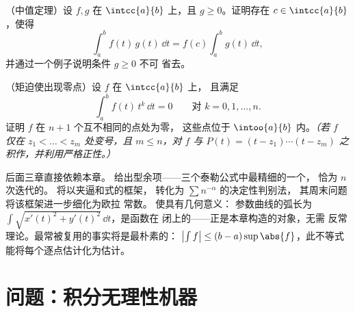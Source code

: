 \begin{exercise}[$\star\star$]\label{exo:b1:integration:11}
（中值定理）设 $f, g$ 在
$\intcc{a}{b}$ 上，且 $g \geq 0$。证明存在 $c \in
\intcc{a}{b}$，使得
\[
\int_a^b f(t)\,g(t)\,\dd t = f(c)\int_a^b g(t)\,\dd t ,
\]
并通过一个例子说明条件 $g \geq 0$ 不可
省去。
\end{exercise}

\begin{exercise}[$\star\star\star$]\label{exo:b1:integration:12}
（矩迫使出现零点）设 $f$ 在 $\intcc{a}{b}$ 上，
且满足
\[
\int_a^b f(t)\,t^k\,\dd t = 0 \qquad \text{对 } k = 0, 1,
\dots, n .
\]
证明 $f$ 在 $n + 1$ 个互不相同的点处为零，
这些点位于 $\intoo{a}{b}$ 内。\emph{（若 $f$ 仅在 $z_1 < \dots
< z_m$ 处变号，且 $m \leq n$，对 $f$ 与 $P(t) = (t - z_1)
\cdots (t - z_m)$ 之积作，并利用严格正性。）}
\end{exercise}

\begin{remark}[本分册内的展望]
后面三章直接依赖本章。
 给出型余项——三个泰勒公式中最精细的一个，
恰为 $n$ 次迭代的。
 将以夹逼和式的框架，
转化为 $\sum n^{-\alpha}$ 的决定性判别法，
其周末问题将该框架进一步细化为欧拉
常数。 使具有几何意义：
参数曲线的弧长为 $\int \sqrt{x'(t)^2 +
y'(t)^2}\,\dd t$，是函数在
闭上的——正是本章构造的对象，无需
反常理论。最常被复用的事实将是最朴素的：
$\bigl|\int f\bigr| \leq (b - a)\sup\abs{f}$，此不等式
能将每个逐点估计化为估计。
\end{remark}

\section{问题：积分无理性机器}

